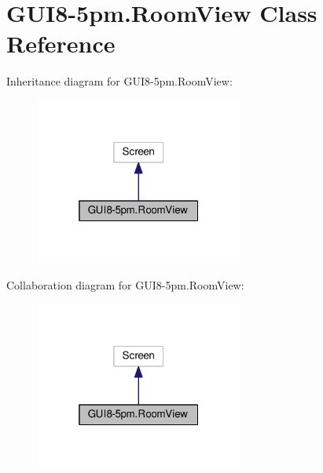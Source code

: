 \hypertarget{classGUI8-5pm_1_1RoomView}{}\section{G\+U\+I8-\/5pm.Room\+View Class Reference}
\label{classGUI8-5pm_1_1RoomView}


Inheritance diagram for G\+U\+I8-\/5pm.Room\+View\+:
\nopagebreak
\begin{figure}[H]
\begin{center}
\leavevmode
\includegraphics[width=193pt]{classGUI8-5pm_1_1RoomView__inherit__graph}
\end{center}
\end{figure}


Collaboration diagram for G\+U\+I8-\/5pm.Room\+View\+:
\nopagebreak
\begin{figure}[H]
\begin{center}
\leavevmode
\includegraphics[width=193pt]{classGUI8-5pm_1_1RoomView__coll__graph}
\end{center}
\end{figure}
